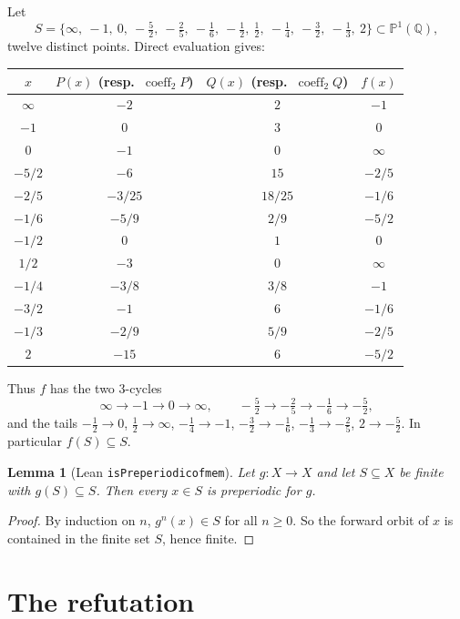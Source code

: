 \documentclass[11pt]{article}
\newtheorem{lemma}[theorem]{Lemma}
\theoremstyle{definition}
\theoremstyle{remark}
\renewcommand{\_}{\oldus\allowbreak}
\newcommand{\PP}{\mathbb{P}^1(\mathbb{Q})}
\begin{document}
Let
\[
  S = \{\infty,\ -1,\ 0,\ -\tfrac52,\ -\tfrac25,\ -\tfrac16,\ -\tfrac12,\ \tfrac12,\ -\tfrac14,\ -\tfrac32,\
  -\tfrac13,\ 2\} \subset \PP,
\]
twelve distinct points. Direct evaluation gives:

\begin{center}
\renewcommand{\arraystretch}{1.25}
\begin{tabular}{c|c|c|c}
$x$ & $P(x)$ (resp.\ $\operatorname{coeff}_2 P$) & $Q(x)$ (resp.\ $\operatorname{coeff}_2 Q$) & $f(x)$ \\ \hline
$\infty$ & $-2$ & $2$ & $-1$ \\
$-1$ & $0$ & $3$ & $0$ \\
$0$ & $-1$ & $0$ & $\infty$ \\ \hline
$-5/2$ & $-6$ & $15$ & $-2/5$ \\
$-2/5$ & $-3/25$ & $18/25$ & $-1/6$ \\
$-1/6$ & $-5/9$ & $2/9$ & $-5/2$ \\ \hline
$-1/2$ & $0$ & $1$ & $0$ \\
$1/2$ & $-3$ & $0$ & $\infty$ \\
$-1/4$ & $-3/8$ & $3/8$ & $-1$ \\
$-3/2$ & $-1$ & $6$ & $-1/6$ \\
$-1/3$ & $-2/9$ & $5/9$ & $-2/5$ \\
$2$ & $-15$ & $6$ & $-5/2$ \\
\end{tabular}
\end{center}

Thus $f$ has the two $3$-cycles
\[
  \infty\to -1\to 0\to\infty, \qquad -\tfrac52\to -\tfrac25\to -\tfrac16\to -\tfrac52,
\]
and the tails
$-\tfrac12\to 0$, $\tfrac12\to\infty$, $-\tfrac14\to -1$, $-\tfrac32\to -\tfrac16$,
$-\tfrac13\to -\tfrac25$, $2\to -\tfrac52$. In particular $f(S)\subseteq S$.

\begin{lemma}[Lean \texttt{isPreperiodic\_of\_mem}]\label{lem:inv}
Let $g:X\to X$ and let $S\subseteq X$ be finite with $g(S)\subseteq S$. Then every $x\in S$ is preperiodic
for $g$.
\end{lemma}

\begin{proof}
By induction on $n$, $g^n(x)\in S$ for all $n\ge 0$. So the forward orbit of $x$ is contained in the finite
set $S$, hence finite.
\end{proof}

\section{The refutation}
\end{document}
